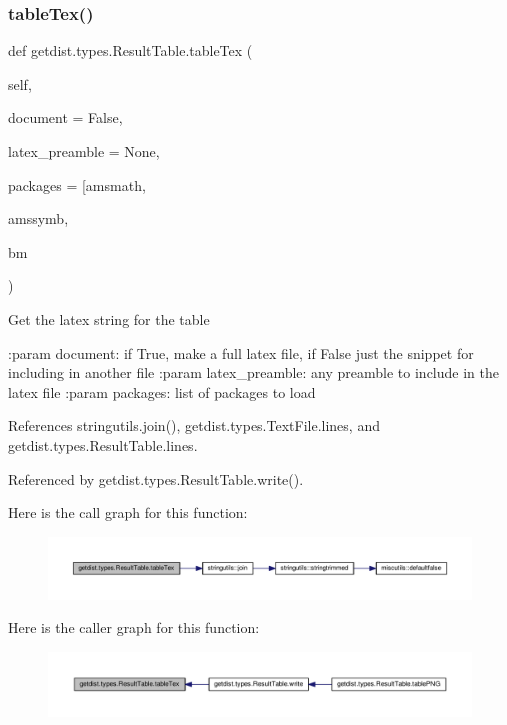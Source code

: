 \subsubsection{\texorpdfstring{table\+Tex()}{tableTex()}}
{\footnotesize\ttfamily def getdist.\+types.\+Result\+Table.\+table\+Tex (\begin{DoxyParamCaption}\item[{}]{self,  }\item[{}]{document = {\ttfamily False},  }\item[{}]{latex\+\_\+preamble = {\ttfamily None},  }\item[{}]{packages = {\ttfamily \mbox{[}\textquotesingle{}amsmath\textquotesingle{}},  }\item[{}]{amssymb,  }\item[{}]{bm }\end{DoxyParamCaption})}

\begin{DoxyVerb}Get the latex string for the table

:param document: if True, make a full latex file, if False just the snippet for including in another file
:param latex_preamble: any preamble to include in the latex file
:param packages: list of packages to load
\end{DoxyVerb}
 

References stringutils.\+join(), getdist.\+types.\+Text\+File.\+lines, and getdist.\+types.\+Result\+Table.\+lines.



Referenced by getdist.\+types.\+Result\+Table.\+write().

Here is the call graph for this function\+:
\nopagebreak
\begin{figure}[H]
\begin{center}
\leavevmode
\includegraphics[width=350pt]{classgetdist_1_1types_1_1ResultTable_a7afab33d231bed5c1ee97b2e9af37c3f_cgraph}
\end{center}
\end{figure}
Here is the caller graph for this function\+:
\nopagebreak
\begin{figure}[H]
\begin{center}
\leavevmode
\includegraphics[width=350pt]{classgetdist_1_1types_1_1ResultTable_a7afab33d231bed5c1ee97b2e9af37c3f_icgraph}
\end{center}
\end{figure}
\mbox{\label{classgetdist_1_1types_1_1ResultTable_a76ef92c87d609551019760f157829f2c}} 
